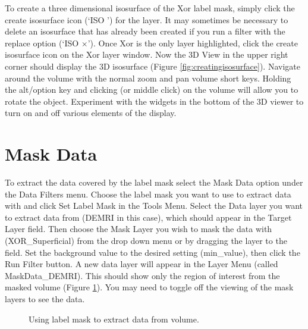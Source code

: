 \documentclass[fleqn,11pt,openany]{book}
\begin{document}
To create a three dimensional isosurface of the Xor label mask, simply click the create isosurface icon (`ISO \Forward') for the layer.
It may sometimes be necessary to delete an isosurface that has already been created if you run a filter with the replace option  (`ISO $\times$').
Once Xor is the only layer highlighted, click the create isosurface icon on the Xor layer window.
Now the 3D View in the upper right corner should display the 3D isosurface (Figure \ref{fig:creatingisosurface}).
Navigate around the volume with the normal zoom and pan volume short keys.
Holding the alt/option key and clicking (or middle click) on the volume will allow you to rotate the object.
Experiment with the widgets in the bottom of the 3D viewer to turn on and off various elements of the display.



\section{Mask Data}

To extract the data covered by the label mask select the Mask Data option under the Data Filters menu.  Choose the label mask you want to use to extract data with and click Set Label Mask in the Tools Menu.  Select the Data layer you want to extract data from (DEMRI in this case), which should appear in the Target Layer field.  Then choose the Mask Layer you wish to mask the data with (XOR\_Superficial) from the drop down menu or by dragging the layer to the field.  Set the background value to the desired setting (min\_value), then click the Run Filter button.  A new data layer will appear in the Layer Menu (called MaskData\_DEMRI).  This should show only the region of interest from the masked volume (Figure \ref{fig:maskdata}).  You may need to toggle off the viewing of the mask layers to see the data.

\begin{figure}
\caption{Using label mask to extract data from volume.}\label{fig:maskdata}
\end{figure}
\end{document}
